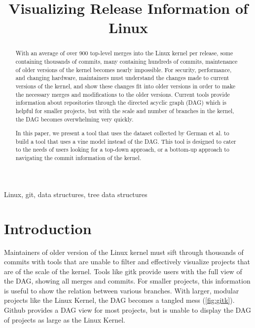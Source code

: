 \documentclass[conference, draftclsnofoot]{IEEEtran}
\makeatletter
\newcommand{\TheTitle}{Visualizing Release Information of Linux}
\newcommand{\TheAuthors}{Evan Wilde}
\newcommand{\TheEmails}{etcwilde@uvic.ca}
\newcommand{\TheKeywords}{Linux, git, data structures, tree data structures}
\makeatother
\begin{document}
\title{\TheTitle}
\author{
\IEEEauthorblockA{\TheAuthors}
\IEEEauthorblockA{Email: \TheEmails}
}
\maketitle
\begin{abstract}

	With an average of over 900 top-level merges into the Linux kernel per
	release, some containing thousands of commits, many containing hundreds
	of commits, maintenance of older versions of the kernel becomes nearly
	impossible. For security, performance, and changing hardware,
	maintainers must understand the changes made to current versions of the
	kernel, and show these changes fit into older versions in order to make
	the necessary merges and modifications to the older versions. Current
	tools provide information about repositories through the directed
	acyclic graph (DAG) which is helpful for smaller projects, but with the
	scale and number of branches in the kernel, the DAG becomes
	overwhelming very quickly.

	In this paper, we present a tool that uses the dataset collected by
	German et al. to build a tool that uses a vine model instead of the
	DAG. This tool is designed to cater to the needs of users looking for a
	top-down approach, or a bottom-up approach to navigating the commit
	information of the kernel.
\end{abstract}

\begin{IEEEkeywords}
\TheKeywords
\end{IEEEkeywords}

\section{Introduction}

Maintainers of older version of the Linux kernel must sift through thousands of
commits with tools that are unable to filter and effectively visualize projects
that are of the scale of the kernel. Tools like gitk provide users with the
full view of the DAG, showing all merges and commits. For smaller projects,
this information is useful to show the relation between various branches.
With larger, modular projects like the Linux Kernel, the DAG becomes a tangled
mess (\ref{fig:gitk}). Github provides a DAG view for most projects, but is
unable to display the DAG of projects as large as the Linux Kernel.
\end{document}

